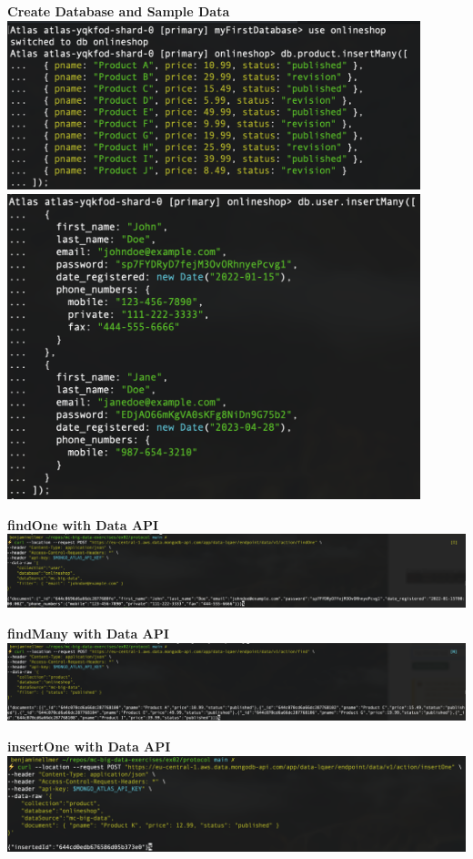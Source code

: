 \documentclass[14pt,a4paper]{extarticle}
\begin{document}
	\noindent \textbf{Create Database and Sample Data} \\
	\includegraphics[width=0.9\textwidth]{images/sc07.png} \\
	\includegraphics[width=0.9\textwidth]{images/sc08.png} 

	\newpage

	\noindent \textbf{findOne with Data API} \\
	\includegraphics[width=\textwidth]{images/sc09.png}

	\noindent \textbf{findMany with Data API} \\
	\includegraphics[width=\textwidth]{images/sc10.png} 

	\noindent \textbf{insertOne with Data API} \\
	\includegraphics[width=\textwidth]{images/sc11.png} 
\end{document}
